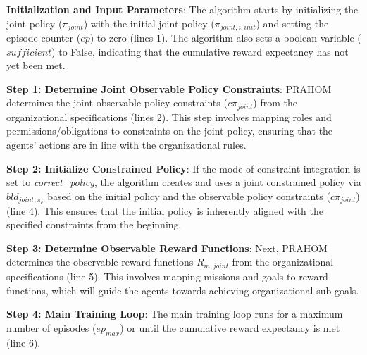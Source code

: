 \documentclass[conference]{IEEEtran}
\begin{document}
\textbf{Initialization and Input Parameters}: \quad
The algorithm starts by initializing the joint-policy ($\pi_{joint}$) with the initial joint-policy ($\pi_{joint,i,init}$) and setting the episode counter ($ep$) to zero (lines 1). The algorithm also sets a boolean variable ($sufficient$) to False, indicating that the cumulative reward expectancy has not yet been met.

\textbf{Step 1: Determine Joint Observable Policy Constraints}: \quad
PRAHOM determines the joint observable policy constraints ($c\pi_{joint}$) from the organizational specifications (lines 2). This step involves mapping roles and permissions/obligations to constraints on the joint-policy, ensuring that the agents' actions are in line with the organizational rules.

\textbf{Step 2: Initialize Constrained Policy}: \quad
If the mode of constraint integration is set to \textit{correct\_policy}, the algorithm creates and uses a joint constrained policy via $bld_{joint, \pi_c}$ based on the initial policy and the observable policy constraints ($c\pi_{joint}$) (line 4). This ensures that the initial policy is inherently aligned with the specified constraints from the beginning.

\textbf{Step 3: Determine Observable Reward Functions}: \quad
Next, PRAHOM determines the observable reward functions $R_{m,joint}$ from the organizational specifications (line 5). This involves mapping missions and goals to reward functions, which will guide the agents towards achieving organizational sub-goals.

\textbf{Step 4: Main Training Loop}: \quad
The main training loop runs for a maximum number of episodes ($ep_{max}$) or until the cumulative reward expectancy is met (line 6).
\end{document}
